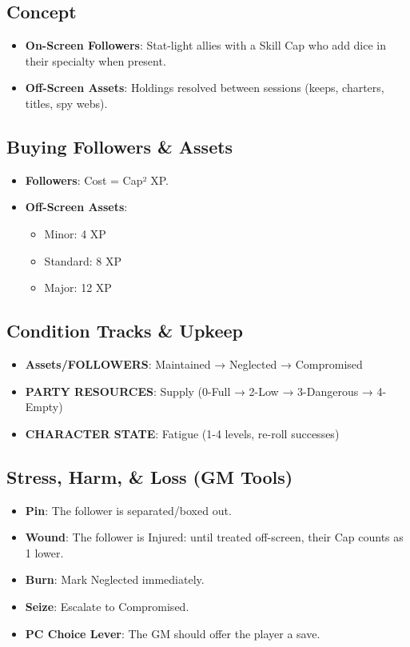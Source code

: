 \documentclass[11pt]{article}
\begin{document}
\subsection{Concept}
\begin{itemize}
    \item \textbf{On-Screen Followers}: Stat-light allies with a Skill Cap who add dice in their specialty when present.
    \item \textbf{Off-Screen Assets}: Holdings resolved between sessions (keeps, charters, titles, spy webs).
\end{itemize}

\subsection{Buying Followers \& Assets}
\begin{itemize}
    \item \textbf{Followers}: Cost = Cap² XP.
    \item \textbf{Off-Screen Assets}:
    \begin{itemize}
        \item Minor: 4 XP
        \item Standard: 8 XP
        \item Major: 12 XP
    \end{itemize}
\end{itemize}

\subsection{Condition Tracks \& Upkeep}
\begin{itemize}
    \item \textbf{Assets/FOLLOWERS}: Maintained → Neglected → Compromised
    \item \textbf{PARTY RESOURCES}: Supply (0-Full → 2-Low → 3-Dangerous → 4-Empty)
    \item \textbf{CHARACTER STATE}: Fatigue (1-4 levels, re-roll successes)
\end{itemize}

\subsection{Stress, Harm, \& Loss (GM Tools)}
\begin{itemize}
    \item \textbf{Pin}: The follower is separated/boxed out.
    \item \textbf{Wound}: The follower is Injured: until treated off-screen, their Cap counts as 1 lower.
    \item \textbf{Burn}: Mark Neglected immediately.
    \item \textbf{Seize}: Escalate to Compromised.
    \item \textbf{PC Choice Lever}: The GM should offer the player a save.
\end{itemize}
\end{document}

